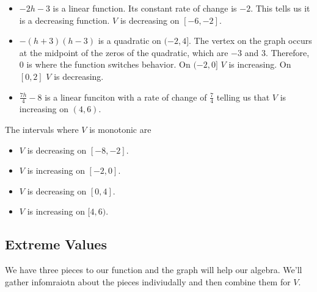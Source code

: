 \documentclass{ximera}
\begin{document}
\begin{itemize}
\item \textbf{$-2h-3$} is a linear function.  Its constant rate of change is $-2$.  This tells us it is a decreasing function.  $V$ is decreasing on $[-6, -2]$.

\item \textbf{$-(h+3)(h-3)$} is a quadratic on $(-2, 4]$. The vertex on the graph occurs at the midpoint of the zeros of the quadratic, which are $-3$ and $3$.  Therefore, $0$ is where the function switches behavior.  On $(-2, 0]$ $V$ is increasing.  On $[0,2]$ $V$ is decreasing.


\item \textbf{$\frac{7h}{4} - 8$} is a linear funciton with a rate of change of $\frac{7}{4}$ telling us that $V$ is increasing on $(4, 6)$.


\end{itemize}





The intervals where $V$ is monotonic are

\begin{itemize}
\item $V$ is decreasing on $[-8,-2]$.
\item $V$ is increasing on $[-2,0]$.
\item $V$ is decreasing on $[0,4]$.
\item $V$ is increasing on $[4,6)$.
\end{itemize}









\subsection{Extreme Values} 


We have three pieces to our function and the graph will help our algebra. We'll gather infomraiotn about the pieces indiviudally and then combine them for $V$.
\end{document}
